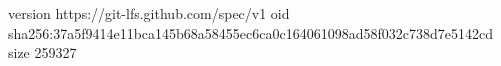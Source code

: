 version https://git-lfs.github.com/spec/v1
oid sha256:37a5f9414e11bca145b68a58455ec6ca0c164061098ad58f032c738d7e5142cd
size 259327
